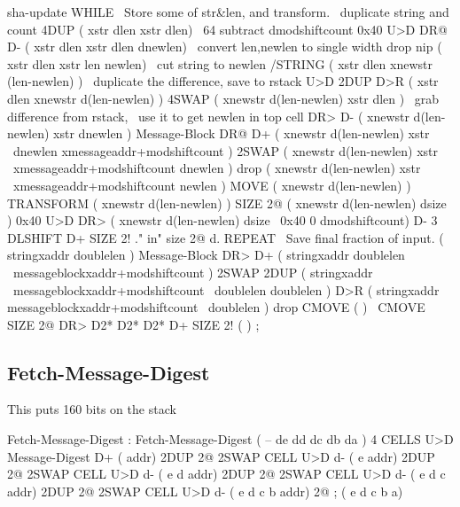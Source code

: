 \begin{chunk}{sha-update}
    WHILE                \ Store some of str&len, and transform. 
                         \ duplicate string and count        
        4DUP                 ( xstr dlen xstr dlen)
                         \ 64 subtract dmodshiftcount 
        0x40 U>D DR@ D-      ( xstr dlen xstr dlen dnewlen)
                         \ convert len,newlen to single width
        drop nip             ( xstr dlen xstr len newlen)
                         \ cut string to newlen
        /STRING              ( xstr dlen xnewstr (len-newlen) )
                         \ duplicate the difference, save to rstack
        U>D 2DUP D>R         ( xstr dlen xnewstr d(len-newlen) )  
        4SWAP                ( xnewstr d(len-newlen) xstr dlen )
                         \ grab difference from rstack, 
                         \ use it to get newlen in top cell
        DR> D-               ( xnewstr d(len-newlen) xstr dnewlen ) 
        Message-Block DR@ D+ ( xnewstr d(len-newlen) xstr 
                             \ dnewlen xmessageaddr+modshiftcount )
        2SWAP                ( xnewstr d(len-newlen) xstr 
                             \ xmessageaddr+modshiftcount dnewlen )
        drop                 ( xnewstr d(len-newlen) xstr 
                             \ xmessageaddr+modshiftcount newlen )
        MOVE                 ( xnewstr d(len-newlen) )
        TRANSFORM            ( xnewstr d(len-newlen) )
        SIZE 2@              ( xnewstr d(len-newlen) dsize ) 
        0x40 U>D DR>         ( xnewstr d(len-newlen) dsize 
                             \  0x40 0 dmodshiftcount)
        D- 
        3 DLSHIFT D+ SIZE 2!  ." in" size 2@ d.
    REPEAT
    \  Save final fraction of input.
                         ( stringxaddr doublelen )
    Message-Block DR> D+ ( stringxaddr doublelen 
                         \ messageblockxaddr+modshiftcount ) 
    2SWAP  2DUP          ( stringxaddr 
                         \ messageblockxaddr+modshiftcount 
                         \ doublelen doublelen )
    D>R                  ( stringxaddr messageblockxaddr+modshiftcount 
                         \ doublelen )
    drop CMOVE  ( )      \ CMOVE
    SIZE 2@ DR>  D2* D2* D2* D+ SIZE 2! ( )
    ;
    
\end{chunk}

\subsection{Fetch-Message-Digest}
This puts 160 bits on the stack
\begin{chunk}{Fetch-Message-Digest}
   : Fetch-Message-Digest   ( -- de dd dc db da )
        4 CELLS U>D Message-Digest D+  ( addr)
            2DUP 2@ 2SWAP CELL U>D d-  ( e addr)
            2DUP 2@ 2SWAP CELL U>D d-  ( e d addr)
            2DUP 2@ 2SWAP CELL U>D d-  ( e d c addr)
            2DUP 2@ 2SWAP CELL U>D d-  ( e d c b addr)
                2@ ;                   ( e d c b a)

\end{chunk}


